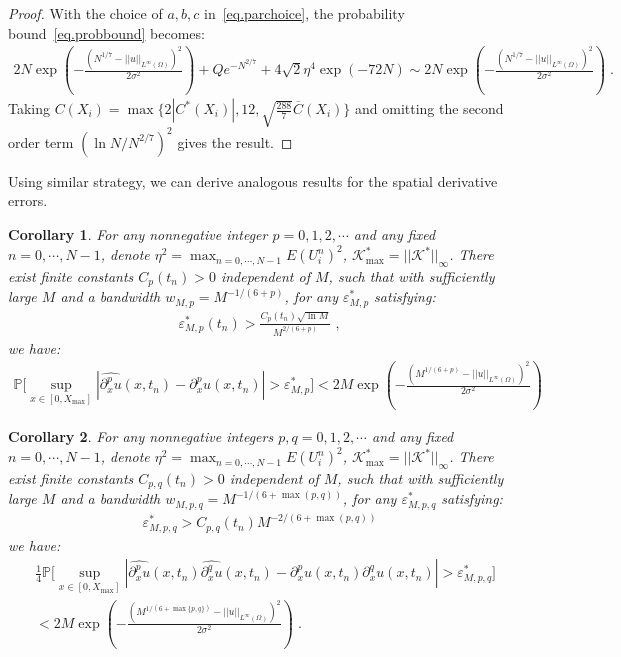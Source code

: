 \documentclass[a4paper,11pt]{article}
\newtheorem{corollary}{Corollary}[section]
\begin{document}
\begin{proof}
With the choice of $a,b,c$ in~\eqref{eq.parchoice}, the probability bound~\eqref{eq.probbound} becomes:
\begin{align*}
2N \exp(-\frac{(N^{1/7}-||u||_{L^\infty(\Omega)})^2}{2\sigma^2})+Qe^{-N^{2/7}}+4\sqrt{2}\eta^4\exp(-72N)\sim 2N \exp(-\frac{(N^{1/7}-||u||_{L^\infty(\Omega)})^2}{2\sigma^2})\;. 
\end{align*}
Taking $C(X_i) = \max\{2|C^*(X_i)|,12,\sqrt{\frac{288}{7}}\overline{C}(X_i)\}$	and omitting the second order term $(\ln N/N^{2/7})^2$ gives the result.
\end{proof}
Using similar strategy, we can derive analogous results for the spatial derivative errors.
\begin{corollary}\label{cor.singlespace}
For any nonnegative integer $p=0,1,2,\cdots$ and any fixed $n=0,\cdots,N-1$, denote $\eta^2 = \max_{n=0,\cdots,N-1}E(U_i^n)^2$, $\mathcal{K}^*_{\max}=||\mathcal{K}^*||_\infty$. There exist finite constants $C_{p}(t_n)>0$ independent of $M$, such that with sufficiently large $M$ and a bandwidth $w_{M,p} = M^{-1/(6+p)}$, for any $\varepsilon_{M,p}^*$ satisfying:
\begin{align*}
\varepsilon_{M,p}^*(t_n)> \frac{C_{p}(t_n)\sqrt{\ln M}}{M^{2/(6+p)}}\;,
\end{align*}
we have:
\begin{align}
\mathbb{P}\Big[\sup_{x\in[0,X_{\max}]}|\widehat{\partial_x^pu}(x,t_n)-\partial_x^pu(x,t_n)|>\varepsilon_{M,p}^*\Big]<2M \exp(-\frac{(M^{1/(6+p)}-||u||_{L^\infty(\Omega)})^2}{2\sigma^2})
\end{align}	
\end{corollary}


\begin{corollary}\label{cor.doublespace}
For any nonnegative integers $p,q=0,1,2,\cdots$ and any fixed $n=0,\cdots,N-1$, denote $\eta^2 = \max_{n=0,\cdots,N-1}E(U_i^n)^2$, $\mathcal{K}^*_{\max}=||\mathcal{K}^*||_\infty$. There exist finite constants $C_{p,q}(t_n)>0$ independent of $M$, such that with sufficiently large $M$ and a bandwidth $w_{M,p,q} =M^{-1/(6+\max(p,q))}$,  for any $\varepsilon_{M,p,q}^*$ satisfying:
\begin{align*}
\varepsilon_{M,p,q}^*> C_{p,q}(t_n)M^{-2/(6+\max(p,q))}
\end{align*}
we have:
\begin{align}
&\frac{1}{4}\mathbb{P}\Big[\sup_{x\in[0,X_{\max}]}|\widehat{\partial_x^pu}(x,t_n)\widehat{\partial_x^qu}(x,t_n)-\partial_x^pu(x,t_n)\partial_x^qu(x,t_n)|>\varepsilon_{M,p,q}^*\Big]\nonumber\\
&<2M \exp(-\frac{(M^{1/(6+\max\{p,q\})}-||u||_{L^\infty(\Omega)})^2}{2\sigma^2})\;.
\end{align}	
\end{corollary}
\end{document}
